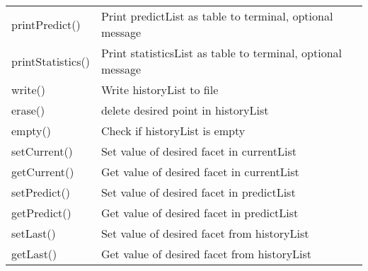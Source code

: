 \begin{center}
\begin{tabular}{|l|l|}
\rule{0pt}{3ex} printPredict()& Print predictList as table to terminal, optional message\\
\rule{0pt}{3ex} printStatistics()& Print statisticsList as table to terminal, optional message\\
\rule{0pt}{3ex} write()& Write historyList to file\\
\rule{0pt}{3ex} erase()& delete desired point in historyList\\
\rule{0pt}{3ex} empty()& Check if historyList is empty\\
\rule{0pt}{3ex} setCurrent()& Set value of desired facet in currentList\\
\rule{0pt}{3ex} getCurrent()& Get value of desired facet in currentList\\
\rule{0pt}{3ex} setPredict()& Set value of desired facet in predictList\\
\rule{0pt}{3ex} getPredict()& Get value of desired facet in predictList\\
\rule{0pt}{3ex} setLast()& Set value of desired facet from historyList\\
\rule{0pt}{3ex} getLast()& Get value of desired facet from historyList\\
\hline
\end{tabular}
\end{center}


